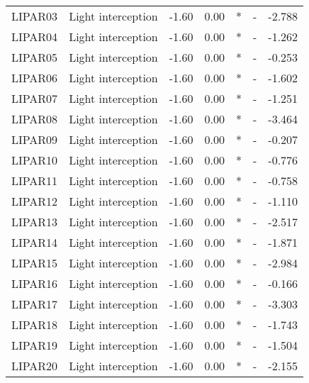 \begin{longtable}{llrrcrr}
    LIPAR03  & Light interception               & -1.60  & 0.00   & *   & -       & -2.788  \\
    LIPAR04  & Light interception               & -1.60  & 0.00   & *   & -       & -1.262  \\
    LIPAR05  & Light interception               & -1.60  & 0.00   & *   & -       & -0.253  \\
    LIPAR06  & Light interception               & -1.60  & 0.00   & *   & -       & -1.602  \\
    LIPAR07  & Light interception               & -1.60  & 0.00   & *   & -       & -1.251  \\
    LIPAR08  & Light interception               & -1.60  & 0.00   & *   & -       & -3.464  \\
    LIPAR09  & Light interception               & -1.60  & 0.00   & *   & -       & -0.207  \\
    LIPAR10  & Light interception               & -1.60  & 0.00   & *   & -       & -0.776  \\
    LIPAR11  & Light interception               & -1.60  & 0.00   & *   & -       & -0.758  \\
    LIPAR12  & Light interception               & -1.60  & 0.00   & *   & -       & -1.110  \\
    LIPAR13  & Light interception               & -1.60  & 0.00   & *   & -       & -2.517  \\
    LIPAR14  & Light interception               & -1.60  & 0.00   & *   & -       & -1.871  \\
    LIPAR15  & Light interception               & -1.60  & 0.00   & *   & -       & -2.984  \\
    LIPAR16  & Light interception               & -1.60  & 0.00   & *   & -       & -0.166  \\
    LIPAR17  & Light interception               & -1.60  & 0.00   & *   & -       & -3.303  \\
    LIPAR18  & Light interception               & -1.60  & 0.00   & *   & -       & -1.743  \\
    LIPAR19  & Light interception               & -1.60  & 0.00   & *   & -       & -1.504  \\
    LIPAR20  & Light interception               & -1.60  & 0.00   & *   & -       & -2.155  \\
\end{longtable}
